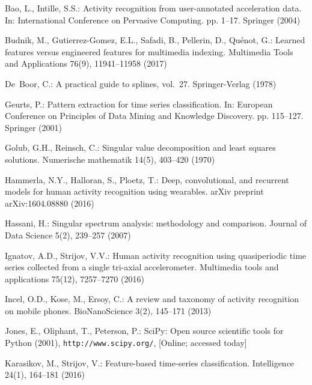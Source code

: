 \documentclass[a4paper,12pt]{article}
\begin{document}
\begin{thebibliography}{10}
	\providecommand{\url}[1]{\texttt{#1}}
	\providecommand{\urlprefix}{URL }
	
	Bao, L., Intille, S.S.: Activity recognition from user-annotated acceleration
	data. In: International Conference on Pervasive Computing. pp. 1--17.
	Springer (2004)
	
	Budnik, M., Gutierrez-Gomez, E.L., Safadi, B., Pellerin, D., Qu{\'e}not, G.:
	Learned features versus engineered features for multimedia indexing.
	Multimedia Tools and Applications  76(9),  11941--11958 (2017)
	
	De~Boor, C.: A practical guide to splines, vol.~27. Springer-Verlag (1978)
	
	Geurts, P.: Pattern extraction for time series classification. In: European
	Conference on Principles of Data Mining and Knowledge Discovery. pp.
	115--127. Springer (2001)
	
	Golub, G.H., Reinsch, C.: Singular value decomposition and least squares
	solutions. Numerische mathematik  14(5),  403--420 (1970)
	
	Hammerla, N.Y., Halloran, S., Ploetz, T.: Deep, convolutional, and recurrent
	models for human activity recognition using wearables. arXiv preprint
	arXiv:1604.08880  (2016)
	
	Hassani, H.: Singular spectrum analysis: methodology and comparison. Journal of
	Data Science  5(2),  239--257 (2007)
	
	Ignatov, A.D., Strijov, V.V.: Human activity recognition using quasiperiodic
	time series collected from a single tri-axial accelerometer. Multimedia tools
	and applications  75(12),  7257--7270 (2016)
	
	Incel, O.D., Kose, M., Ersoy, C.: A review and taxonomy of activity recognition
	on mobile phones. BioNanoScience  3(2),  145--171 (2013)
	
	Jones, E., Oliphant, T., Peterson, P.: {SciPy}: Open source scientific tools
	for {Python} (2001), \url{http://www.scipy.org/}, [Online; accessed today]
	
	Karasikov, M., Strijov, V.: Feature-based time-series classification.
	Intelligence  24(1),  164--181 (2016)
	

\end{thebibliography}
\end{document}

